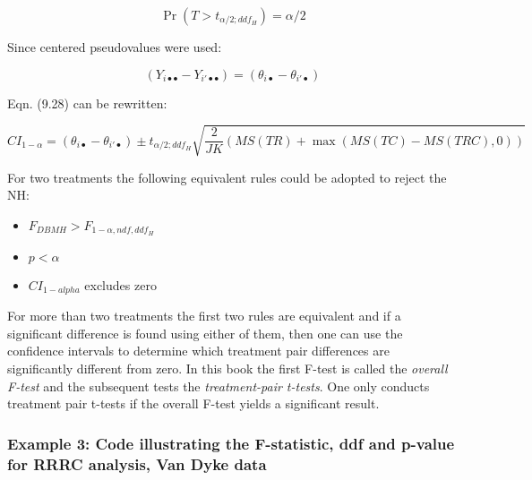 \documentclass[
]{book}
\providecommand{\tightlist}{%
  \setlength{\itemsep}{0pt}\setlength{\parskip}{0pt}}
\begin{document}
\begin{equation}
\Pr\left ( T>t_{\alpha/2;ddf_H} \right )=\alpha/2
\label{eq:tDistTailProb}
\end{equation}

Since centered pseudovalues were used:

\begin{equation}
\left ( Y_{i \bullet \bullet} - Y_{i' \bullet \bullet} \right )=\left ( \theta_{i \bullet } - \theta_{i' \bullet} \right )
\end{equation}

Eqn. (9.28) can be rewritten:

\begin{equation}
CI_{1-\alpha}=\left ( \theta_{i \bullet} - \theta_{i' \bullet} \right ) \pm t_{\alpha/2;ddf_H} \sqrt{\frac{2}{JK}\left ( MS(TR) + \max\left ( MS(TC)-MS(TRC),0 \right ) \right )}
\label{eq:confIntervalRRRC}
\end{equation}

For two treatments the following equivalent rules could be adopted to reject the NH:

\begin{itemize}
\tightlist
\item
  \(F_{DBMH} > F_{1-\alpha,ndf,ddf_H}\)
\item
  \(p < \alpha\)
\item
  \(CI_{1-alpha}\) excludes zero
\end{itemize}

For more than two treatments the first two rules are equivalent and if a significant difference is found using either of them, then one can use the confidence intervals to determine which treatment pair differences are significantly different from zero. In this book the first F-test is called the \emph{overall F-test} and the subsequent tests the \emph{treatment-pair t-tests}. One only conducts treatment pair t-tests if the overall F-test yields a significant result.

\hypertarget{example-3-code-illustrating-the-f-statistic-ddf-and-p-value-for-rrrc-analysis-van-dyke-data}{%
\subsubsection{Example 3: Code illustrating the F-statistic, ddf and p-value for RRRC analysis, Van Dyke data}\label{example-3-code-illustrating-the-f-statistic-ddf-and-p-value-for-rrrc-analysis-van-dyke-data}}
\end{document}
